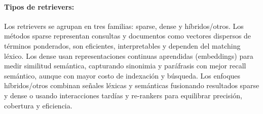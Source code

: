 \paragraph{Tipos de retrievers:} Los retrievers se agrupan en tres familias: sparse, dense y híbridos/otros.
Los métodos sparse representan consultas y documentos como vectores dispersos de términos ponderados, son eficientes, interpretables y dependen del matching léxico.
Los dense usan representaciones continuas aprendidas (embeddings) para medir similitud semántica, capturando sinonimia y paráfrasis con mejor recall semántico, aunque
 con mayor costo de indexación y búsqueda. Los enfoques híbridos/otros combinan señales léxicas y semánticas
fusionando resultados sparse y dense o usando interacciones tardías  y re-rankers para equilibrar precisión, cobertura y eficiencia.

